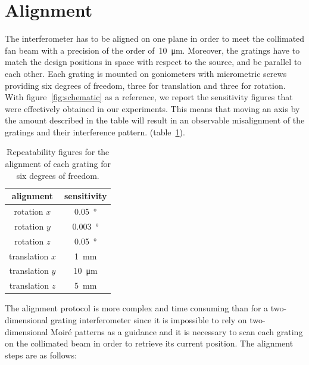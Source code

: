 \section{Alignment}
The interferometer has to be aligned on one plane in order to meet the
collimated fan beam with a precision of the order of~\SI{10}{\micro\metre}.
Moreover, the gratings have to match the design positions in space with
respect to the source, and be parallel to each other.
Each grating is mounted on goniometers with micrometric screws providing six
degrees of freedom, three for translation and three for rotation.
With figure~\ref{fig:schematic} as a reference, we report the sensitivity
figures that were effectively obtained in our experiments. This means that
moving an axis by the amount described in the table will result in an
observable misalignment of the gratings and their interference pattern.
(table~\ref{tab:allineamento}).
\begin{table}[htb]
    \centering
    \begin{tabular}{*2c}
        \toprule
        alignment & sensitivity\\
        \midrule
        rotation $x$ & \SI{0.05}{\degree}\\
        rotation $y$ & \SI{0.003}{\degree}\\
        rotation $z$ & \SI{0.05}{\degree}\\
        translation $x$ & \SI{1}{\milli\metre}\\
        translation $y$ & \SI{10}{\micro\metre}\\
        translation $z$ & \SI{5}{\milli\metre}\\
        \bottomrule
    \end{tabular}
    \caption{Repeatability figures for the alignment of each grating for six
    degrees of freedom.}
    \label{tab:allineamento}
\end{table}
The alignment protocol is more complex and time consuming than for a
two-dimensional grating interferometer since it is impossible to rely on
two-dimensional Moir\'e patterns as a guidance and it is necessary to scan
each grating on the collimated beam in order to retrieve its current position.
The alignment steps are as follows:

